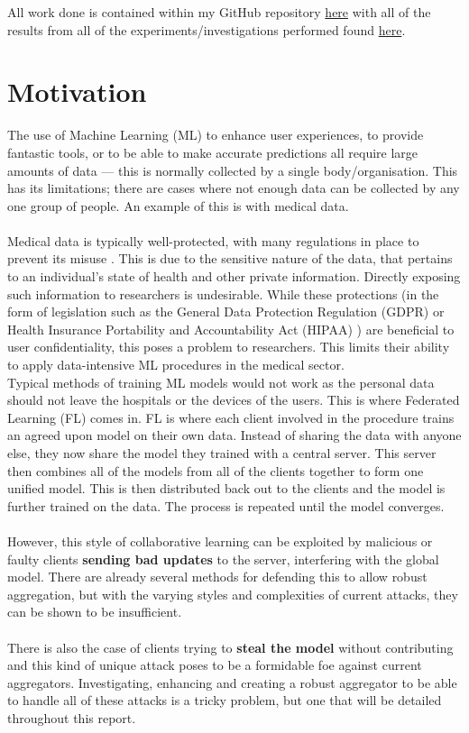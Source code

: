 All work done is contained within my GitHub repository \href{https://github.com/SamuelTrew/FederatedLearning}{here} with all of the results from all of the experiments/investigations performed found \href{https://github.com/SamuelTrew/FYP_Results}{here}.

\section{Motivation}
The use of Machine Learning (ML) to enhance user experiences, to provide fantastic tools, or to be able to make accurate predictions all require large amounts of data --- this is normally collected by a single body/organisation.
This has its limitations; there are cases where not enough data can be collected by any one group of people. 
An example of this is with medical data.
\\ \\
Medical data is typically well-protected, with many regulations in place to prevent its misuse \cite{nhs_digital_data}.  
This is due to the sensitive nature of the data, that pertains to an individual's state of health and other private information.
Directly exposing such information to researchers is undesirable. 
While these protections (in the form of legislation such as the General Data Protection Regulation (GDPR) \cite{gdpr} or Health Insurance Portability and Accountability Act (HIPAA) \cite{hipaa}) are beneficial to user confidentiality, this poses a problem to researchers. 
This limits their ability to apply data-intensive ML procedures in the medical sector.\\

Typical methods of training ML models would not work as the personal data should not leave the hospitals or the devices of the users. 
This is where Federated Learning (FL) \cite{federated_comic} comes in. 
FL is where each client involved in the procedure trains an agreed upon model on their own data. 
Instead of sharing the data with anyone else, they now share the model they trained with a central server. 
This server then combines all of the models from all of the clients together to form one unified model. 
This is then distributed back out to the clients and the model is further trained on the data. 
The process is repeated until the model converges.
\\ \\
However, this style of collaborative learning can be exploited by malicious or faulty clients \textbf{sending bad updates} to the server, interfering with the global model. 
There are already several methods for defending this to allow robust aggregation, but with the varying styles and complexities of current attacks, they can be shown to be insufficient.
\\ \\
There is also the case of clients trying to \textbf{steal the model} without contributing and this kind of unique attack poses to be a formidable foe against current aggregators.
Investigating, enhancing and creating a robust aggregator to be able to handle all of these attacks is a tricky problem, but one that will be detailed throughout this report.


